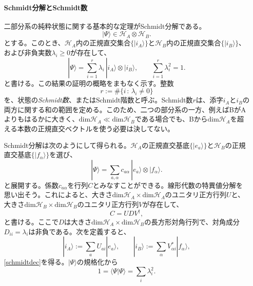\documentclass[a4paper,11pt,oneside]{article}
\theoremstyle{definition}
\numberwithin{equation}{section}
\begin{document}
\paragraph{Schmidt分解とSchmidt数}



二部分系の純粋状態に関する基本的な定理がSchmidt分解である。
\begin{equation}
|\Psi\rangle \in \mathcal H_A \otimes \mathcal H_B .
\end{equation}
とする。このとき、$\mathcal H_A$内の正規直交集合$\{|i_A\rangle\}$と$\mathcal H_B$内の正規直交集合$\{|i_B\rangle\}$、および非負実数$\lambda_i \ge 0$が存在して、
\begin{equation}\label{schmidtdec}
|\Psi\rangle = \sum_{i=1}^r \lambda_i \, |i_A\rangle \otimes |i_B\rangle ,
\qquad
\sum_{i=1}^r \lambda_i^2 = 1 .
\end{equation}
と書ける。この結果の証明の概略をまもなく示す。整数
\begin{equation}
r := \#\{i \, : \, \lambda_i \neq 0\}
\end{equation}
を、状態の\textit{Schmidt数}、またはSchmidt階数と呼ぶ。Schmidt数$ r$は、添字$ i_{A}$と$ i_{B}$の両方に関する和の範囲を定める。このため、二つの部分系の一方、例えばBがAよりもはるかに大きく、$\text{dim}\mathcal{H}_{A} \ll \text{dim}\mathcal{H}_{B} $である場合でも、Bから$\text{dim}\mathcal{H}_{A} $を超える本数の正規直交ベクトルを使う必要は決してない。



Schmidt分解は次のようにして得られる。$\mathcal H_A$の正規直交基底$\{|e_a\rangle\}$と$\mathcal H_B$の正規直交基底$\{|f_\alpha\rangle\}$を選び、
\begin{equation}
|\Psi\rangle = \sum_{a,\alpha} c_{a\alpha} \, |e_a\rangle \otimes |f_\alpha\rangle .
\end{equation}
と展開する。係数$c_{a\alpha}$を行列$C$とみなすことができる。線形代数の特異値分解を思い出そう。これによると、大きさ$ \text{dim}\mathcal{H}_{A}\times\text{dim}\mathcal{H}_{A}$のユニタリ正方行列$U$と、大きさ$ \text{dim}\mathcal{H}_{B}\times\text{dim}\mathcal{H}_{B}$のユニタリ正方行列$V$が存在して、
\begin{equation}
C = U D V^\dagger ,
\end{equation}
と書ける。ここで$D$は大きさ$ \text{dim}\mathcal{H}_{A}\times \text{dim}\mathcal{H}_{B}$の長方形対角行列で、対角成分$D_{ii}=\lambda_i$は非負である。次を定義すると、
\begin{equation}
|i_A\rangle := \sum_a U_{ai} |e_a\rangle ,
\qquad
|i_B\rangle := \sum_\alpha V^*_{\alpha i} |f_\alpha\rangle ,
\end{equation}
\eqref{schmidtdec}を得る。$|\Psi\rangle$の規格化から
\begin{equation}
1 = \langle \Psi|\Psi\rangle = \sum_i \lambda_i^2 .
\end{equation}
\end{document}
